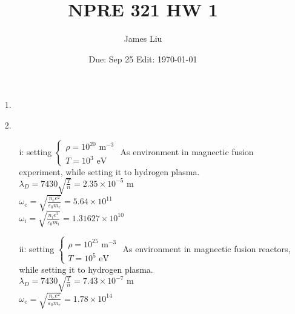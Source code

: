 \documentclass{article}
\date{Due: Sep 25 Edit: \today}
\title{NPRE 321 HW 1}
\author{James Liu}
\begin{document}
\maketitle
\begin{itemize}
    \item [1.]
    \item [2.] 
        \begin{itemize}
            \item [i:] setting \(\left\{\begin{matrix}
                \rho = 10^{20} \text{ m}^{-3}\\
                T    = 10^3 \text{ eV}
            \end{matrix}\right.\) As environment in magnectic fusion experiment, while setting it to hydrogen plasma.\\
            \(\lambda_D = 7430\sqrt{\frac{T}{n}} = 2.35 \times 10^{-5} \text{ m}\)\\
            \(\omega_e = \sqrt{\frac{n_ee^2}{\varepsilon_0m_e}} = 5.64\times 10^{11}\)\\
            \(\omega_i = \sqrt{\frac{n_ie^2}{\varepsilon_0m_i}} = 1.31627\times 10^{10}\)
            \item [ii:] setting \(\left\{\begin{matrix}
                \rho = 10^{25} \text{ m}^{-3}\\
                T    = 10^5 \text{ eV}
            \end{matrix}\right.\) As environment in magnectic fusion reactors, while setting it to hydrogen plasma.\\
            \(\lambda_D = 7430\sqrt{\frac{T}{n}} = 7.43 \times 10^{-7} \text{ m}\)\\
            \(\omega_e = \sqrt{\frac{n_ee^2}{\varepsilon_0m_e}} = 1.78\times 10^{14}\)\\

\end{itemize}
\end{itemize}
\end{document}
